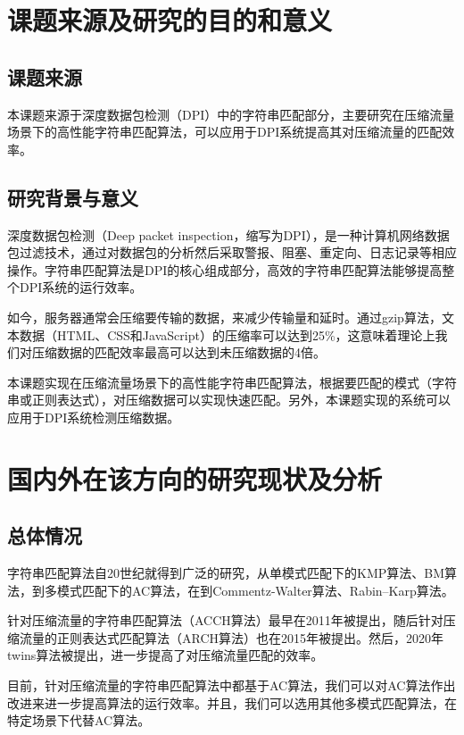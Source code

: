 
\section{课题来源及研究的目的和意义}
\subsection{课题来源}
本课题来源于深度数据包检测（DPI）中的字符串匹配部分，主要研究在压缩流量场景下的高性能字符串匹配算法，可以应用于DPI系统提高其对压缩流量的匹配效率。

\vspace{3mm}
\subsection{研究背景与意义}
深度数据包检测（Deep packet inspection，缩写为DPI），是一种计算机网络数据包过滤技术，通过对数据包的分析然后采取警报、阻塞、重定向、日志记录等相应操作。字符串匹配算法是DPI的核心组成部分，高效的字符串匹配算法能够提高整个DPI系统的运行效率。

如今，服务器通常会压缩要传输的数据，来减少传输量和延时。通过gzip算法\cite{RFC1952}，文本数据（HTML、CSS和JavaScript）的压缩率可以达到25\%，这意味着理论上我们对压缩数据的匹配效率最高可以达到未压缩数据的4倍。

本课题实现在压缩流量场景下的高性能字符串匹配算法，根据要匹配的模式（字符串或正则表达式），对压缩数据可以实现快速匹配。另外，本课题实现的系统可以应用于DPI系统检测压缩数据。
\vspace{8mm}
\section{国内外在该方向的研究现状及分析}
\subsection{总体情况}
字符串匹配算法自20世纪就得到广泛的研究，从单模式匹配下的KMP算法\cite{knuth1977fast}、BM算法\cite{boyer1977fast}，到多模式匹配下的AC算法\cite{aho1975efficient}，在到Commentz-Walter算法\cite{commentz1979string}、Rabin–Karp算法\cite{karp1987efficient}。

针对压缩流量的字符串匹配算法（ACCH算法）最早在2011年被提出\cite{bremler2011accelerating}，随后针对压缩流量的正则表达式匹配算法（ARCH算法）\cite{becchi2015accelerating}也在2015年被提出。然后，2020年twins算法\cite{sun2020efficient}被提出，进一步提高了对压缩流量匹配的效率。

目前，针对压缩流量的字符串匹配算法中都基于AC算法，我们可以对AC算法作出改进来进一步提高算法的运行效率\cite{李雪莹2004字符串匹配技术研究}。并且，我们可以选用其他多模式匹配算法，在特定场景下代替AC算法。

